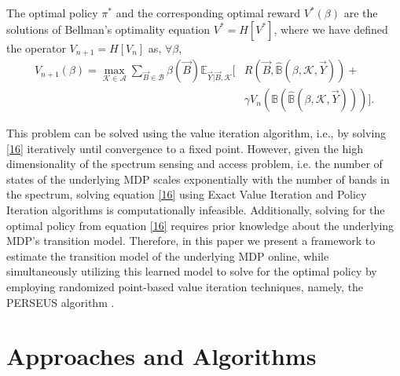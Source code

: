 \documentclass[10pt,twocolumn]{IEEEtran}
\begin{document}
The optimal policy $\pi^*$ and the corresponding optimal reward $V^*(\beta)$ are the solutions of Bellman's optimality equation $V^*=H[V^*]$, where we have defined the operator $V_{n+1}=H[V_n]$ as, $\forall \beta$,
\begin{equation}\label{16}
    \begin{aligned}
        V_{n+1}(\beta) = \max_{\mathcal{K} {\in} \mathcal{A}} \sum_{\vec{B} {\in} \mathcal{B}} \beta(\vec{B}) \mathbb{E}_{\vec{Y}|\vec{B}, \mathcal{K}} \Big[&R(\vec{B}, \hat{\mathbb{B}}(\beta, \mathcal{K}, \vec{Y})) +\\ &\gamma V_n(\mathbb{B}(\hat{\mathbb{B}}(\beta, \mathcal{K}, \vec{Y})))\Big].
    \end{aligned}
\end{equation}

This problem can be solved using the value iteration algorithm, i.e., by solving \eqref{16} iteratively until convergence to a fixed point. However, given the high dimensionality of the spectrum sensing and access problem, i.e. the number of states of the underlying MDP scales exponentially with the number of bands in the spectrum, solving equation \eqref{16} using Exact Value Iteration and Policy Iteration algorithms is computationally infeasible. Additionally, solving for the optimal policy from equation \eqref{16} requires prior knowledge about the underlying MDP's transition model. Therefore, in this paper we present a framework to estimate the transition model of the underlying MDP online, while simultaneously utilizing this learned model to solve for the optimal policy by employing randomized point-based value iteration techniques, namely, the PERSEUS algorithm \cite{DBLP:journals/corr/abs-1109-2145}.
\section{Approaches and Algorithms}\label{III}
\end{document}
